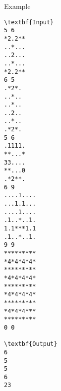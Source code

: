Example
\begin{verbatim}
\textbf{Input}
5 6
*2.2**
..*...
..2...
..*...
*2.2**
6 5
.*2*.
..*..
..*..
..2..
..*..
.*2*.
5 6
.1111.
**...*
33....
**...0
.*2**.
6 9
....1....
...1.1...
....1....
.1..*..1.
1.1***1.1
.1..*..1.
9 9
*********
*4*4*4*4*
*********
*4*4*4*4*
*********
*4*4*4*4*
*********
*4*4*4***
*********
0 0

\textbf{Output}
6
5
5
6
23\end{verbatim}